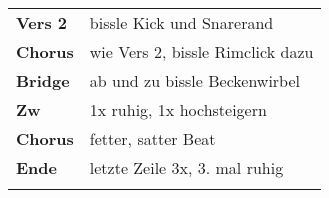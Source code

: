 
\begin{tabular}{p{1.6cm}l}
	\textbf{Vers 2} & bissle Kick und Snarerand        \\
	\textbf{Chorus} & wie Vers 2, bissle Rimclick dazu \\
	\textbf{Bridge} & ab und zu bissle Beckenwirbel    \\
	\textbf{Zw}     & 1x ruhig, 1x hochsteigern        \\
	\textbf{Chorus} & fetter, satter Beat              \\
	\textbf{Ende}   & letzte Zeile 3x, 3. mal ruhig    \\
	                &                                  \\
\end{tabular}
